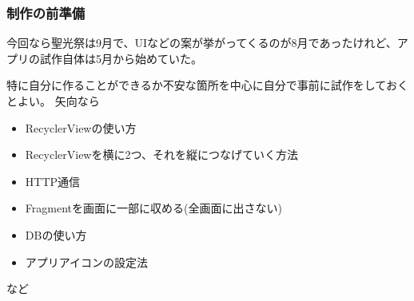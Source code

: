 \documentclass[a4paper]{ltjsreport}
\begin{document}
\subsubsection{制作の前準備}
今回なら聖光祭は9月で、UIなどの案が挙がってくるのが8月であったけれど、アプリの試作自体は5月から始めていた。\par
特に自分に作ることができるか不安な箇所を中心に自分で事前に試作をしておくとよい。
矢向なら
\begin{itemize}
  \item RecyclerViewの使い方
  \item RecyclerViewを横に2つ、それを縦につなげていく方法
  \item HTTP通信
  \item Fragmentを画面に一部に収める(全画面に出さない)
  \item DBの使い方
  \item アプリアイコンの設定法
\end{itemize}
など
\end{document}
